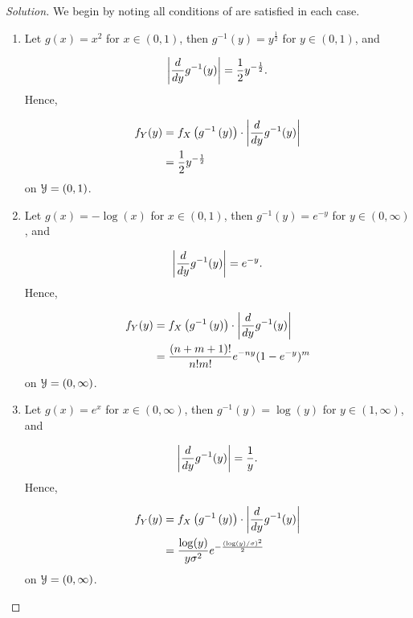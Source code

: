 \documentclass[12pt,letterpaper,reqno]{amsart}
\numberwithin{equation}{subsection}
\begin{document}
\begin{proof}[Solution]
We begin by noting all conditions of \cite[Theorem 2.1.5 on page 51]{Berger-Casella} are satisfied in each case.

\begin{enumerate}[label=(\alph*),leftmargin=*]
    \item Let $g(x) = x^2$ for $x \in (0, 1)$, then $g^{-1}(y) = y^{\frac{1}{2}}$ for $y \in (0, 1)$, and
    
    \begin{align*}
        \left\lvert{\frac{d{}}{d{y}} g^{-1}(y)}\right\rvert = \frac{1}{2} y^{-\frac{1}{2}}.
    \end{align*}
    Hence,
    
    \begin{align*}
        {f_Y}\! \left( {y} \right) &= f_X \left( g^{-1} \left( y \right) \right) \cdot \left\lvert{\frac{d{}}{d{y}} g^{-1}(y)}\right\rvert \\
        &=  \frac{1}{2} y^{-\frac{1}{2}}
    \end{align*}
    on $\mathcal{{Y}} = (0, 1)$.
    
    \item Let $g(x) = -\log(x)$ for $x \in (0, 1)$, then $g^{-1}(y) = e^{-y}$ for $y \in (0, \infty)$, and
    
    \begin{align*}
        \left\lvert{\frac{d{}}{d{y}} g^{-1}(y)}\right\rvert = e^{-y}.
    \end{align*}
    Hence,
    
    \begin{align*}
        {f_Y}\! \left( {y} \right) &= f_X \left( g^{-1} \left( y \right) \right) \cdot \left\lvert{\frac{d{}}{d{y}} g^{-1}(y)}\right\rvert \\
        &=  \frac{(n+m+1)!}{n!m!}e^{-ny} (1-e^{-y})^m
    \end{align*}
    on $\mathcal{{Y}} = (0, \infty)$.
    
    \item Let $g(x) = e^x$ for $x \in (0, \infty)$, then $g^{-1}(y) = \log(y)$ for $y \in (1, \infty)$, and
    
    \begin{align*}
        \left\lvert{\frac{d{}}{d{y}} g^{-1}(y)}\right\rvert = \frac{1}{y}.
    \end{align*}
    Hence,
    
    \begin{align*}
        {f_Y}\! \left( {y} \right) &= f_X \left( g^{-1} \left( y \right) \right) \cdot \left\lvert{\frac{d{}}{d{y}} g^{-1}(y)}\right\rvert \\
        &=  \frac{\log(y)}{y\sigma^2}e^{-\frac{(\log(y)/\sigma)^2}{2}}
    \end{align*}
    on $\mathcal{{Y}} = (0, \infty)$.
\end{enumerate}
\end{proof}
\end{document}

